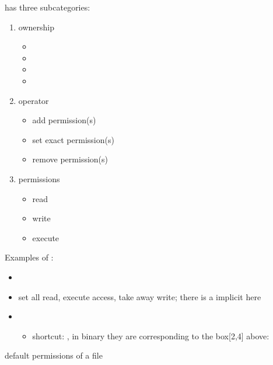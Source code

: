  has three subcategories:
\begin{enumerate}
    \item ownership
          \begin{itemize}
              \item {} \textrightarrow{} 
              \item {} \textrightarrow{} 
              \item {} \textrightarrow{} 
              \item {} \textrightarrow{} 
          \end{itemize}
    \item operator
          \begin{itemize}
              \item \code{+} \textrightarrow{} add permission(s)
              \item \code{=} \textrightarrow{} set exact permission(s)
              \item \code{-} \textrightarrow{} remove permission(s)
          \end{itemize}
    \item permissions
          \begin{itemize}
              \item {} \textrightarrow{} read
              \item {} \textrightarrow{} write
              \item {} \textrightarrow{} execute
          \end{itemize}
\end{enumerate}
Examples of :
\begin{itemize}
    \item {}
    \item {} \textrightarrow{} set all read, execute access,
          take away write; there is a implicit  here
    \item {}
          \begin{itemize}
              \item shortcut: , in binary they are corresponding
                    to the box[2,4] above: 
          \end{itemize}
\end{itemize}

 \textrightarrow{} default permissions of a file

